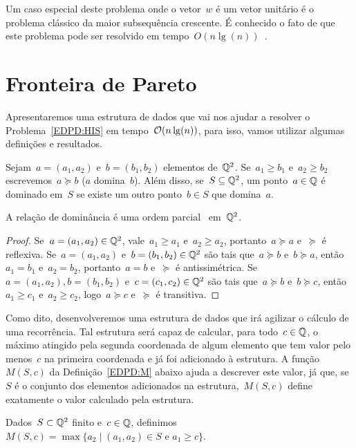 Um caso especial deste problema onde o vetor~$w$ é um vetor unitário é o problema clássico da maior subsequência crescente. É conhecido o fato de que este problema pode ser resolvido em tempo~$O(n\lg(n))$~\cite{Fredman:1975}. 


\section{Fronteira de Pareto}

Apresentaremos uma estrutura de dados que vai nos ajudar a resolver o Problema~\ref{EDPD:HIS} em tempo~$\mathcal{O}(n\lg(n))$, para isso, vamos utilizar algumas definições e resultados.

\begin{defi}
Sejam~${ a = (a_1,a_2) }$ e~${ b = (b_1,b_2) }$ elementos de~$\mathbb{Q}^2$. Se~${ a_1 \geq b_1 }$ e~${ a_2 \geq b_2 }$ escrevemos~${ a \succeq b }$ ($a$ domina~$b$). Além disso, se~${ S \subseteq \mathbb{Q}^2 }$, um ponto~${ a \in \mathbb{Q} }$ é dominado em~$S$ se existe um outro ponto~$b \in S$ que domina~$a$.
\end{defi}

\begin{prop}
A relação de dominância é uma ordem parcial~\cite[Apêndice B]{CLRS} em~$\mathbb{Q}^2$.
\end{prop}
\begin{proof}
Se~$a = (a_1,a_2) \in \mathbb{Q}^2$, vale~$a_1 \geq a_1$ e~$a_2 \geq a_2$, portanto~$a \succeq a$ e~$\succeq$ é reflexiva. Se~$a = (a_1,a_2)$ e~$b = (b_1,b_2) \in \mathbb{Q}^2$ são tais que~$a \succeq b$ e~$b \succeq a$, então~$a_1 = b_1$ e~$a_2 = b_2$, portanto~$a = b$ e~$\succeq$ é antissimétrica. Se~$a = (a_1,a_2), b = (b_1,b_2)$ e~$c = (c_1,c_2) \in \mathbb{Q}^2$ são tais que~$a \succeq b$ e~$b \succeq c$, então~$a_1 \geq c_1$ e~$a_2 \geq c_2$, logo~$a \succeq c$ e~$\succeq$ é transitiva.
\end{proof}

Como dito, desenvolveremos uma estrutura de dados que irá agilizar o cálculo de uma recorrência. Tal estrutura será capaz de calcular, para todo~${ c \in \mathbb{Q} }$, o máximo atingido pela segunda coordenada de algum elemento que tem valor pelo menos~$c$ na primeira coordenada e já foi adicionado à estrutura. A função~$M(S,c)$ da Definição~\ref{EDPD:M} abaixo ajuda a descrever este valor, já que, se~$S$ é o conjunto dos elementos adicionados na estrutura,~$M(S,c)$ define exatamente o valor calculado pela estrutura.
\begin{defi} \label{EDPD:M}
Dados~$S \subset \mathbb{Q}^2$ finito e~$c \in \mathbb{Q}$, definimos~${M(S,c) = \max\{a_2 \mid (a_1,a_2) \in S \text{ e } a_1 \geq c\}}$.
\end{defi}


